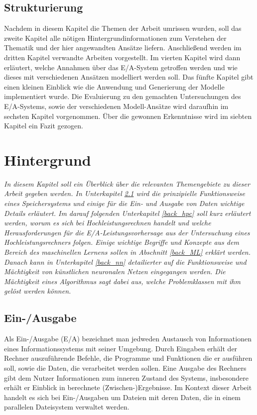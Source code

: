 \documentclass[
	12pt,
	a4paper,
	BCOR10mm,
	DIV14,
	listof=totoc,
	bibliography=totoc,
	headsepline
]{scrreprt}
\begin{document}
\section{Strukturierung}
Nachdem in diesem Kapitel die Themen der Arbeit umrissen wurden, soll das zweite Kapitel alle nötigen Hintergrundinformationen zum Verstehen der Thematik und der hier angewandten Ansätze liefern. Anschließend werden im dritten Kapitel verwandte Arbeiten vorgestellt.
Im vierten Kapitel wird dann erläutert, welche Annahmen über das E/A-System getroffen werden und wie dieses mit verschiedenen Ansätzen modelliert werden soll.
Das fünfte Kapitel gibt einen kleinen Einblick wie die Anwendung und Generierung der Modelle implementiert wurde.
Die Evaluierung zu den gemachten Untersuchungen des E/A-Systems, sowie der verschiedenen Modell-Ansätze wird daraufhin im sechsten Kapitel vorgenommen.
Über die gewonnen Erkenntnisse wird im siebten Kapitel ein Fazit gezogen.
\bigskip

\chapter{Hintergrund}
\label{Hintergrund}
\textit{
	In diesem Kapitel soll ein Überblick über die relevanten Themengebiete zu dieser Arbeit gegeben werden.
	In Unterkapitel \ref{back_E/A} wird die prinzipielle Funktionsweise eines Speichersystems und einige für die Ein- und Ausgabe von Daten wichtige Details erläutert.
	Im darauf folgenden Unterkapitel \ref{back_hpc} soll kurz erläutert werden, worum es sich bei Hochleistungsrechnen handelt und welche Herausforderungen für die E/A-Leistungsvorhersage aus der Untersuchung eines Hochleistungsrechners folgen.
	Einige wichtige Begriffe und Konzepte aus dem Bereich des maschinellen Lernens sollen in Abschnitt \ref{back_ML} erklärt werden.
	Danach kann in Unterkapitel \ref{back_nn} detailierter auf die Funktionsweise und Mächtigkeit von künstlichen neuronalen Netzen eingegangen werden. Die Mächtigkeit eines Algorithmus sagt dabei aus, welche Problemklassen mit ihm gelöst werden können. 
}
\bigskip

\section{Ein-/Ausgabe}
\label{back_E/A}
Als Ein-/Ausgabe (E/A) bezeichnet man jedweden Austausch von Informationen eines Informationssystems mit seiner Umgebung. Durch Eingaben erhält der Rechner auszuführende Befehle, die Programme und Funktionen die er ausführen soll, sowie die Daten, die verarbeitet werden sollen.
Eine Ausgabe des Rechners gibt dem Nutzer Informationen zum inneren Zustand des Systems, insbesondere erhält er Einblick in berechnete (Zwischen-)Ergebnisse.  
Im Kontext dieser Arbeit handelt es sich bei Ein-/Ausgaben um Dateien mit deren Daten, die in einem parallelen Dateisystem verwaltet werden.
\medskip
\end{document}
